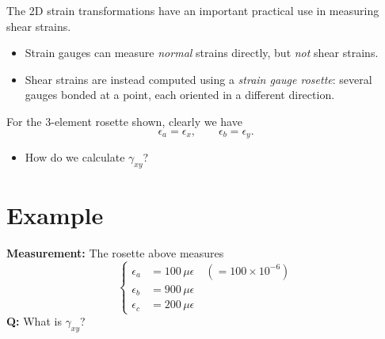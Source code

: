\documentclass[11pt]{article}
\begin{document}
\noindent
\begin{minipage}[c]{0.55\textwidth}
The 2D strain transformations have an important practical use in measuring shear strains.
\begin{itemize}
  \item Strain gauges can measure \emph{normal} strains directly, but \emph{not} shear
        strains.
  \item Shear strains are instead computed using a \emph{strain gauge rosette}: several
        gauges bonded at a point, each oriented in a different direction.
\end{itemize}
For the 3-element rosette shown, clearly we have
\[
  \epsilon_a = \epsilon_x, \qquad \epsilon_b = \epsilon_y.
\]
\begin{itemize}[label=$\rightarrow$]
  \item How do we calculate $\gamma_{xy}$?
\end{itemize}
\end{minipage}%
\hfill
\begin{minipage}[c]{0.42\textwidth}
\centering
{}
\end{minipage}

\section*{Example}

\noindent
\textbf{Measurement:} The rosette above measures
\[
  \left\{
  \begin{aligned}
    \epsilon_a &= 100\,\mu\epsilon \quad (= 100 \times 10^{-6}) \\
    \epsilon_b &= 900\,\mu\epsilon \\
    \epsilon_c &= 200\,\mu\epsilon
  \end{aligned}
  \right.
\]
\textbf{Q:} What is $\gamma_{xy}$?
\end{document}
